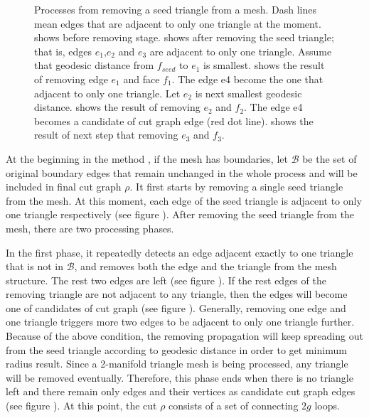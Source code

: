 \documentclass[a4paper,twoside]{article}
\begin{document}
\begin{figure}[t]
	\caption{Processes from removing a seed triangle from a mesh. Dash lines mean edges that are adjacent to only one triangle at the moment.  shows before removing stage.  shows after removing the seed triangle; that is, edges $e_1$,$e_2$ and $e_3$ are adjacent to only one triangle. Assume that geodesic distance from $f_{seed}$ to $e_1$ is smallest.  shows the result of removing edge $e_1$ and face $f_1$. The edge e4 become the one that adjacent to only one triangle. Let $e_2$ is next smallest geodesic distance.  shows the result of removing $e_2$ and $f_2$. The edge e4 becomes a candidate of cut graph edge (red dot line).  shows the result of next step that removing $e_3$ and $f_3$.}
	\label{fig:OriginalGenusReduceMethodStepByStep}
\end{figure}

At the beginning in the method , if the mesh has boundaries, let $\mathscr{B}$  be the set of original boundary edges that remain unchanged in the whole process and will be included in final cut graph ${\rho}$. It first starts by removing a single seed triangle from the mesh. At this moment, each edge of the seed triangle is adjacent to only one triangle respectively (see figure ).  After removing the seed triangle from the mesh, there are two processing phases.

In the first phase, it repeatedly detects an edge adjacent exactly to one triangle that is not in $\mathscr{B}$, and removes both the edge and the triangle from the mesh structure. The rest two edges are left (see figure ). If the rest edges of the removing triangle are not adjacent to any triangle, then the edges will become one of candidates of cut graph (see figure ). Generally, removing one edge and one triangle triggers more two edges to be adjacent to only one triangle further. Because of the above condition, the removing propagation will keep spreading out from the seed triangle according to geodesic distance in order to get minimum radius result. Since a 2-manifold triangle mesh is being processed, any triangle will be removed eventually. Therefore, this phase ends when there is no triangle left and there remain only edges and their vertices as candidate cut graph edges (see figure ). At this point, the cut $\rho$ consists of a set of connecting $2g$ loops.
\end{document}

